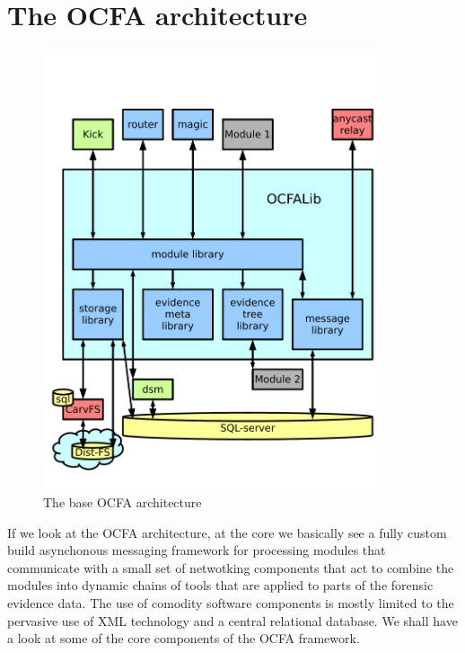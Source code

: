 \section{The OCFA architecture}
\begin{figure}
\centering
\includegraphics[width=100mm]{mattock/libraryview.pdf}
\caption{The base OCFA architecture}
\label{fig:FlowInOut}
\end{figure}
If we look at the OCFA architecture, at the core we basically see a fully custom build asynchonous messaging framework for processing modules that communicate with a small set of netwotking components that act to combine the modules into dynamic chains of tools that are applied to parts of the forensic evidence data. The use of comodity software components is mostly limited to the pervasive use of XML technology and a central relational database. We shall have a look at some of the core components of the OCFA framework.
